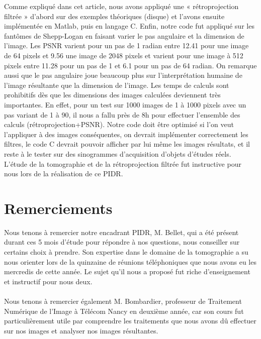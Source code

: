 \documentclass[conference]{IEEEtran}
\begin{document}
Comme expliqué dans cet article, nous avons appliqué une « rétroprojection filtrée » d’abord sur des exemples théoriques (disque) et l’avons ensuite implémentée en Matlab, puis en langage C. Enfin, notre code fut appliqué sur les fantômes de Shepp-Logan en faisant varier le pas angulaire et la dimension de l'image. Les PSNR varient pour un pas de 1 radian entre 12.41 pour une image de 64 pixels et 9.56 une image de 2048 pixels et varient pour une image à 512 pixels entre 11.28 pour un pas de 1 et 6.1 pour un pas de 64 radian. On remarque aussi que le pas angulaire joue beaucoup plus sur l'interprétation humaine de l'image résultante que la dimension de l'image. Les temps de calculs sont prohibitifs dès que les dimensions des images calculées deviennent très importantes. En effet, pour un test sur 1000 images de 1 à 1000 pixels avec un pas variant de 1 à 90, il nous a fallu près de 8h pour effectuer l'ensemble des calculs (rétroprojection+PSNR). Notre code doit être optimisé si l'on veut l'appliquer à des images conséquentes, on devrait implémenter correctement les filtres, le code C devrait pouvoir afficher par lui même les images résultats,  et il reste à le tester sur des sinogrammes d'acquisition d'objets d'études réels.
\\
L'étude de la tomographie et de la rétroprojection filtrée fut instructive pour nous lors de la réalisation de ce PIDR.




\section*{Remerciements}

Nous tenons à remercier notre encadrant PIDR, M. Bellet, qui a été présent durant ces 5 mois d'étude pour répondre à nos questions, nous conseiller sur certains choix à prendre. Son expertise dans le domaine de la tomographie a su nous orienter lors de la quinzaine de réunions téléphoniques que nous avons eu les mercredis de cette année. Le sujet qu'il nous a proposé fut riche d'enseignement et instructif pour nous deux.
\\
\\
Nous tenons à remercier également M. Bombardier, professeur de Traitement Numérique de l'Image à Télécom Nancy en deuxième année, car son cours fut particulièrement utile par comprendre les traitements que nous avons dû effectuer sur nos images et analyser nos images résultantes.
\end{document}
